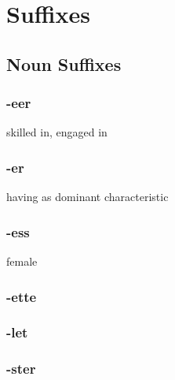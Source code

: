 \chapter{Suffixes}

\section{Noun Suffixes}

\subsection{-eer}

\begin{nlist}{skilled in, engaged in}{}
\end{nlist}

\subsection{-er}

\begin{nlist}{having as dominant characteristic}{}
\end{nlist}

\subsection{-ess}

\begin{nlist}{female}{}
\end{nlist}

\subsection{-ette}

\subsection{-let}

\subsection{-ster}

